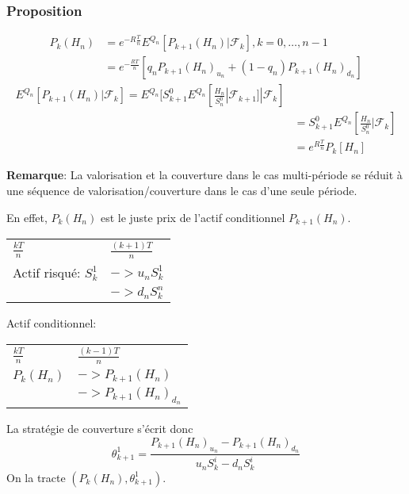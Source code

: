 \documentclass{article}
\begin{document}
\subsubsection{Proposition}

\begin{equation}
\begin{split}
P_k(H_n)&=e^{-R\frac{T}{n}}E^{Q_n}[P_{k+1}(H_n)|\mathcal{F}_k],k=0,\ldots,n-1\\
&=e^{-\frac{RT}{n}}[q_nP_{k+1}(H_n)_{u_n}+(1-q_n)P_{k+1}(H_n)_{d_n}]
\end{split}
\end{equation}
\begin{equation}
\begin{split}
E^{Q_n}[P_{k+1}(H_n)|\mathcal{F}_k]=E^{Q_n}[S_{k+1}^0E^{Q_n}[\frac{H_n}{S_n^0}|\mathcal{F}_{k+1}]|\mathcal{F}_k]\\
&=S^0_{k+1}E^{Q_n}[\frac{H_n}{S_n^0}|\mathcal{F}_k]\\
&=e^{R\frac{T}{n}}P_k[H_n]
\end{split}
\end{equation}

\textbf{Remarque}:
La valorisation et la couverture dans le cas multi-p\'eriode se r\'eduit \`a une s\'equence de valorisation/couverture dans le cas d'une seule p\'eriode.

En effet, $P_k(H_n)$ est le juste prix de l'actif conditionnel $P_{k+1}(H_n)$.
\begin{center}
\begin{tabular}{ll}
 $\frac{kT}{n}$ & $\frac{(k+1)T}{n}$\\
 Actif risqu\'e: $S_k^1$ & $->u_nS_k^1$\\
 & $->d_nS_k^n$
\end{tabular}
\end{center}

Actif conditionnel:
\begin{center}
\begin{tabular}{ll}
$\frac{kT}{n}$ & $\frac{(k-1)T}{n}$ \\ 
$P_k(H_n)$ & $->P_{k+1}(H_n)$\\
&$->P_{k+1}(H_n)_{d_n}$
\end{tabular}
\end{center}

La strat\'egie de couverture s'\'ecrit donc
\begin{equation}
\theta_{k+1}^1=\frac{P_{k+1}{(H_n)_{u_n}}-P_{k+1}(H_n)_{d_n}}{u_nS_k^i-d_nS_k^i}
\end{equation}
On la tracte $(P_k(H_n),\theta_{k+1}^1)$.
\end{document}
